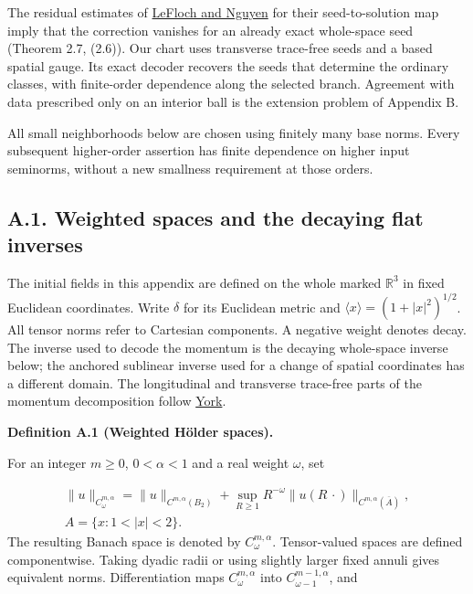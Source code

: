 \documentclass[
  english,
  11pt,
  reqno]{amsart}
\makeatletter
\newcommand{\pandocstatementheading}[1]{%
  \par\addpenalty{\@beginparpenalty}%
  \addvspace{.5\baselineskip plus .2\baselineskip minus .2\baselineskip}%
  {\normalfont\bfseries #1\par}%
  \nobreak\@afterindenttrue\@afterheading
}
\makeatother
\begin{document}
The residual estimates of \hyperref[ref-LeFlochNguyen2023]{LeFloch and
Nguyen} for their seed-to-solution map imply that the correction
vanishes for an already exact whole-space seed (Theorem 2.7, (2.6)). Our
chart uses transverse trace-free seeds and a based spatial gauge. Its
exact decoder recovers the seeds that determine the ordinary classes,
with finite-order dependence along the selected branch. Agreement with
data prescribed only on an interior ball is the extension problem of
Appendix B.

All small neighborhoods below are chosen using finitely many base norms.
Every subsequent higher-order assertion has finite dependence on higher
input seminorms, without a new smallness requirement at those orders.

\subsection{A.1. Weighted spaces and the decaying flat
inverses}\label{a.1.-weighted-spaces-and-the-decaying-flat-inverses}\label{sec:online-weighted-chart-spaces}

The initial fields in this appendix are defined on the whole marked
\(\mathbb R^3\) in fixed Euclidean coordinates. Write \(\delta\) for its
Euclidean metric and \(\langle x\rangle=(1+|x|^2)^{1/2}\). All tensor
norms refer to Cartesian components. A negative weight denotes decay.
The inverse used to decode the momentum is the decaying whole-space
inverse below; the anchored sublinear inverse used for a change of
spatial coordinates has a different domain. The longitudinal and
transverse trace-free parts of the momentum decomposition follow
\hyperref[ref-York1974]{York}.

\pandocstatementheading{\leavevmode{}\label{def:online-weighted-holder-chart-spaces}Definition A.1 (Weighted Hölder spaces).}

For an integer \(m\ge0\), \(0<\alpha<1\) and a real weight \(\omega\),
set

\label{eq:online-chart-weighted-holder-norm} \[
\begin{gathered}
\|u\|_{C^{m,\alpha}_\omega}
=\|u\|_{C^{m,\alpha}(B_2)}
+\sup_{R\ge1}R^{-\omega}
\|u(R\,\cdot)\|_{C^{m,\alpha}(\overline A)}, \\
A=\{x:1<|x|<2\}.
\end{gathered}
\] The resulting Banach space is denoted by \(C^{m,\alpha}_\omega\).
Tensor-valued spaces are defined componentwise. Taking dyadic radii or
using slightly larger fixed annuli gives equivalent norms.
Differentiation maps \(C^{m,\alpha}_\omega\) into
\(C^{m-1,\alpha}_{\omega-1}\), and
\end{document}
